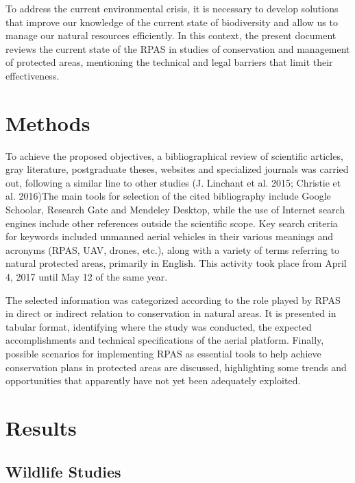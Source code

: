 \documentclass[]{interact}
\theoremstyle{plain}%
\theoremstyle{definition}
\theoremstyle{remark}
\begin{document}
To address the current environmental crisis, it is necessary to develop
solutions that improve our knowledge of the current state of
biodiversity and allow us to manage our natural resources efficiently.
In this context, the present document reviews the current state of the
RPAS in studies of conservation and management of protected areas,
mentioning the technical and legal barriers that limit their
effectiveness.

\section{Methods}\label{methods}

To achieve the proposed objectives, a bibliographical review of
scientific articles, gray literature, postgraduate theses, websites and
specialized journals was carried out, following a similar line to other
studies (J. Linchant et al. 2015; Christie et al. 2016)The main tools
for selection of the cited bibliography include Google Schoolar,
Research Gate and Mendeley Desktop, while the use of Internet search
engines include other references outside the scientific scope. Key
search criteria for keywords included unmanned aerial vehicles in their
various meanings and acronyms (RPAS, UAV, drones, etc.), along with a
variety of terms referring to natural protected areas, primarily in
English. This activity took place from April 4, 2017 until May 12 of the
same year.

The selected information was categorized according to the role played by
RPAS in direct or indirect relation to conservation in natural areas. It
is presented in tabular format, identifying where the study was
conducted, the expected accomplishments and technical specifications of
the aerial platform. Finally, possible scenarios for implementing RPAS
as essential tools to help achieve conservation plans in protected areas
are discussed, highlighting some trends and opportunities that
apparently have not yet been adequately exploited.

\section{Results}\label{results}

\subsection{Wildlife Studies}\label{wildlife-studies}
\end{document}
